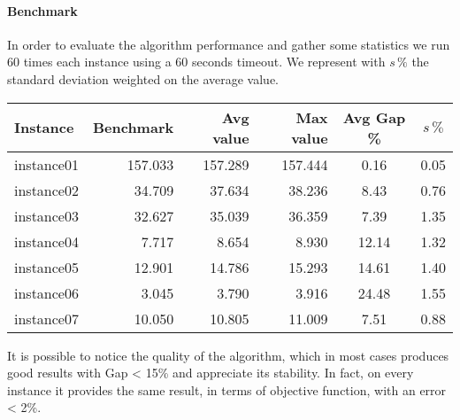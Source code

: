 \paragraph*{Benchmark}
In order to evaluate the algorithm performance and gather some statistics we run 60 times each instance using a 60 seconds timeout. We represent with $s\,\%$ the standard deviation weighted on the average value.
\begin{center}
\small
\begin{tabular}{lrrrcc}
\toprule
Instance	&	Benchmark	&	Avg value	&	Max value	&	Avg Gap \%	&	$s\,\%$	\\
\midrule
instance01	&	157.033		&	157.289		&	157.444		&	0.16		&	0.05	\\
instance02	&	34.709		&	37.634		&	38.236		&	8.43		&	0.76	\\
instance03	&	32.627		&	35.039		&	36.359		&	7.39		&	1.35	\\
instance04	&	7.717		&	8.654		&	8.930		&	12.14		&	1.32	\\
instance05	&	12.901		&	14.786		&	15.293		&	14.61		&	1.40	\\
instance06	&	3.045		&	3.790		&	3.916		&	24.48		&	1.55	\\
instance07	&	10.050		&	10.805		&	11.009		&	7.51		&	0.88	\\
\bottomrule
\end{tabular}
\end{center}
It is possible to notice the quality of the algorithm, which in most cases produces good results with Gap < 15\% and appreciate its stability. In fact, on every instance it provides the same result, in terms of objective function, with an error < 2\%.